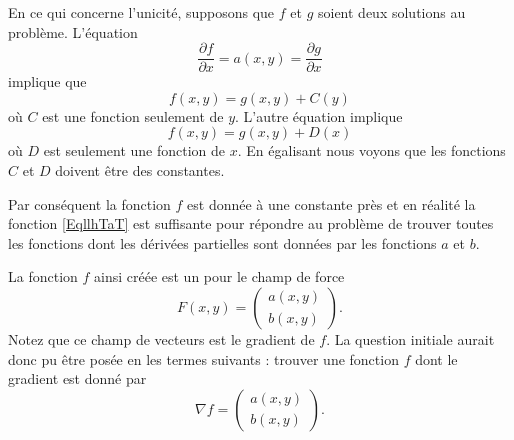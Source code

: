 En ce qui concerne l'unicité, supposons que \( f\) et \( g\) soient deux solutions au problème. L'équation
\begin{equation}
    \frac{ \partial f }{ \partial x }=a(x,y)=\frac{ \partial g }{ \partial x }
\end{equation}
implique que
\begin{equation}
    f(x,y)=g(x,y)+C(y)
\end{equation}
où \( C\) est une fonction seulement de \( y\). L'autre équation implique
\begin{equation}
    f(x,y)=g(x,y)+D(x)
\end{equation}
où \( D\) est seulement une fonction de \( x\). En égalisant nous voyons que les fonctions \( C\) et \( D\) doivent être des constantes.

Par conséquent la fonction \( f\) est donnée à une constante près et en réalité la fonction \eqref{EqllhTaT} est suffisante pour répondre au problème de trouver toutes les fonctions dont les dérivées partielles sont données par les fonctions \( a\) et \( b\).

La fonction \( f\) ainsi créée est un  pour le champ de force
\begin{equation}
    F(x,y)=\begin{pmatrix}
        a(x,y)    \\
        b(x,y)
    \end{pmatrix}.
\end{equation}
Notez que ce champ de vecteurs est le gradient de \( f\). La question initiale aurait donc pu être posée en les termes suivants : trouver une fonction \( f\) dont le gradient est donné par
\begin{equation}
    \nabla f=\begin{pmatrix}
        a(x,y)    \\
        b(x,y)
    \end{pmatrix}.
\end{equation}
